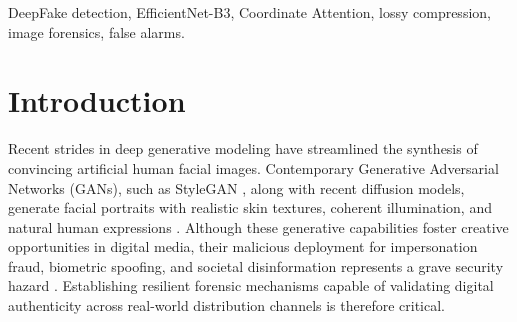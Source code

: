 \documentclass[conference]{IEEEtran}
\begin{document}
\begin{abstract}
The rapid proliferation of deep generative models enables the creation of hyper-realistic facial forgeries that undermine digital content authenticity. While baseline Convolutional Neural Network (CNN) architectures, notably EfficientNet-B3, attain strong discriminative accuracy on uncompressed images, their detection efficacy degrades severely under social media transcoding. Lossy transmission pipelines introduce Discrete Cosine Transform (DCT) quantization noise that obscures subtle synthesis artifacts while introducing deceptive block-boundary patterns. To overcome this limitation, this paper introduces Coord-EfficientNet-B3, a forensic architecture combining directional Coordinate Attention (CoordAtt) with stochastic compression-aware training. By decomposing spatial pooling into orthogonal horizontal and vertical coordinate projections, the model preserves position-sensitive forgery traces while exhibiting resilience against isotropic compression noise. Evaluated across 12,000 multi-condition inferences over diverse Quality Factor (QF) tiers, Coord-EfficientNet-B3 reduces aggregate classification errors by 14.4\% and suppresses false alarms by 24.2\% relative to the standard baseline ($p = 0.00116$, McNemar test). Across an untouched holdout set of 200 facial portraits, the architecture decreases net errors by 49.1\% and halves missed deepfakes at canonical threshold $\tau = 0.50$.
\end{abstract}

\begin{IEEEkeywords}
DeepFake detection, EfficientNet-B3, Coordinate Attention, lossy compression, image forensics, false alarms.
\end{IEEEkeywords}

\section{Introduction}
Recent strides in deep generative modeling have streamlined the synthesis of convincing artificial human facial images. Contemporary Generative Adversarial Networks (GANs), such as StyleGAN \cite{karras2019style}, along with recent diffusion models, generate facial portraits with realistic skin textures, coherent illumination, and natural human expressions \cite{goodfellow2014generative}. Although these generative capabilities foster creative opportunities in digital media, their malicious deployment for impersonation fraud, biometric spoofing, and societal disinformation represents a grave security hazard \cite{mirsky2021creation}. Establishing resilient forensic mechanisms capable of validating digital authenticity across real-world distribution channels is therefore critical.
\end{document}
